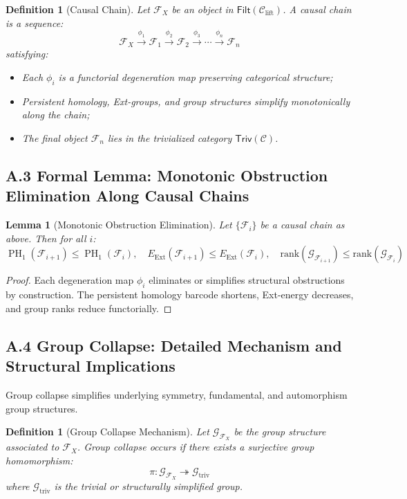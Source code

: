\documentclass[11pt]{article}
\newtheorem{definition}[theorem]{Definition}
\newtheorem{lemma}[theorem]{Lemma}
\DeclareMathOperator{\PH}{PH}
\begin{document}
\begin{definition}[Causal Chain]
Let $\mathcal{F}_X$ be an object in $\mathsf{Filt}(\mathcal{C}_{\mathrm{lift}})$. A causal chain is a sequence:
\[
\mathcal{F}_X \xrightarrow{\phi_1} \mathcal{F}_1 \xrightarrow{\phi_2} \mathcal{F}_2 \xrightarrow{\phi_3} \cdots \xrightarrow{\phi_n} \mathcal{F}_n
\]
satisfying:
\begin{itemize}
    \item Each $\phi_i$ is a functorial degeneration map preserving categorical structure;
    \item Persistent homology, Ext-groups, and group structures simplify monotonically along the chain;
    \item The final object $\mathcal{F}_n$ lies in the trivialized category $\mathsf{Triv}(\mathcal{C})$.
\end{itemize}
\end{definition}

\subsection*{A.3 Formal Lemma: Monotonic Obstruction Elimination Along Causal Chains}

\begin{lemma}[Monotonic Obstruction Elimination]
Let $\{\mathcal{F}_i\}$ be a causal chain as above. Then for all $i$:
\[
\PH_1(\mathcal{F}_{i+1}) \leq \PH_1(\mathcal{F}_i), \quad E_{\mathrm{Ext}}(\mathcal{F}_{i+1}) \leq E_{\mathrm{Ext}}(\mathcal{F}_i), \quad \mathrm{rank}(\mathcal{G}_{\mathcal{F}_{i+1}}) \leq \mathrm{rank}(\mathcal{G}_{\mathcal{F}_i})
\]
\end{lemma}

\begin{proof}
Each degeneration map $\phi_i$ eliminates or simplifies structural obstructions by construction. The persistent homology barcode shortens, Ext-energy decreases, and group ranks reduce functorially.
\end{proof}

\subsection*{A.4 Group Collapse: Detailed Mechanism and Structural Implications}

Group collapse simplifies underlying symmetry, fundamental, and automorphism group structures.

\begin{definition}[Group Collapse Mechanism]
Let $\mathcal{G}_{\mathcal{F}_X}$ be the group structure associated to $\mathcal{F}_X$. Group collapse occurs if there exists a surjective group homomorphism:
\[
\pi: \mathcal{G}_{\mathcal{F}_X} \twoheadrightarrow \mathcal{G}_{\mathrm{triv}}
\]
where $\mathcal{G}_{\mathrm{triv}}$ is the trivial or structurally simplified group.
\end{definition}
\end{document}
